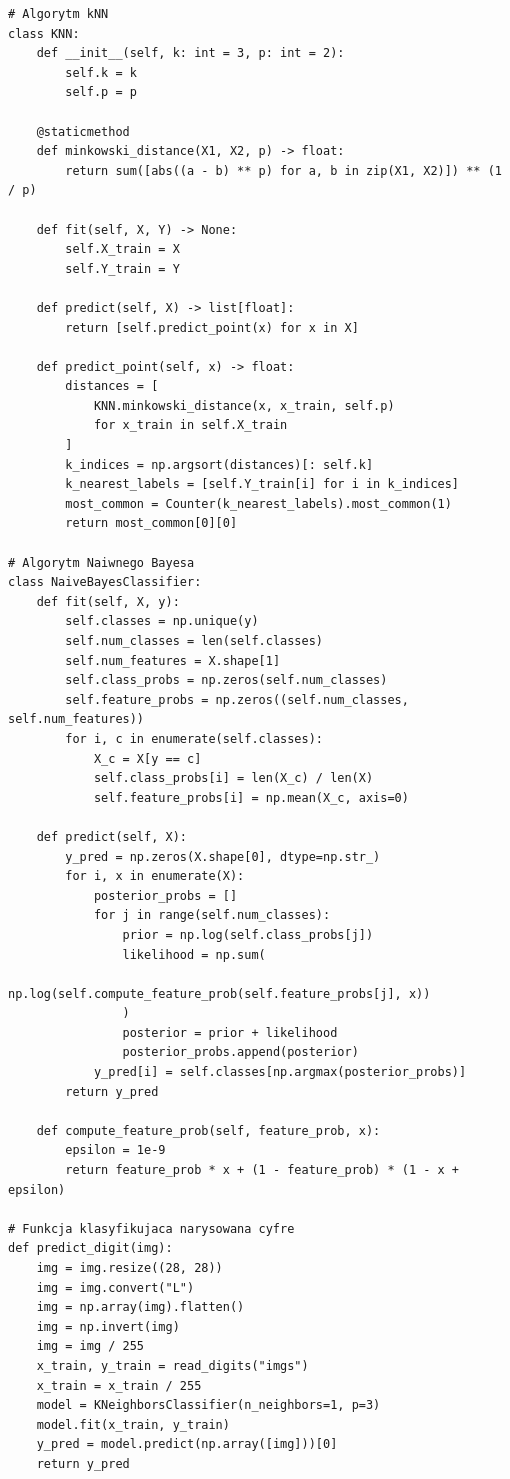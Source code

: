 \documentclass[12pt,a4paper]{article}
\begin{document}
\begin{lstlisting}
# Algorytm kNN
class KNN:
    def __init__(self, k: int = 3, p: int = 2):
        self.k = k
        self.p = p

    @staticmethod
    def minkowski_distance(X1, X2, p) -> float:
        return sum([abs((a - b) ** p) for a, b in zip(X1, X2)]) ** (1 / p)

    def fit(self, X, Y) -> None:
        self.X_train = X
        self.Y_train = Y

    def predict(self, X) -> list[float]:
        return [self.predict_point(x) for x in X]

    def predict_point(self, x) -> float:
        distances = [
            KNN.minkowski_distance(x, x_train, self.p)
            for x_train in self.X_train
        ]
        k_indices = np.argsort(distances)[: self.k]
        k_nearest_labels = [self.Y_train[i] for i in k_indices]
        most_common = Counter(k_nearest_labels).most_common(1)
        return most_common[0][0]

# Algorytm Naiwnego Bayesa
class NaiveBayesClassifier:
    def fit(self, X, y):
        self.classes = np.unique(y)
        self.num_classes = len(self.classes)
        self.num_features = X.shape[1]
        self.class_probs = np.zeros(self.num_classes)
        self.feature_probs = np.zeros((self.num_classes, self.num_features))
        for i, c in enumerate(self.classes):
            X_c = X[y == c]
            self.class_probs[i] = len(X_c) / len(X)
            self.feature_probs[i] = np.mean(X_c, axis=0)

    def predict(self, X):
        y_pred = np.zeros(X.shape[0], dtype=np.str_)
        for i, x in enumerate(X):
            posterior_probs = []
            for j in range(self.num_classes):
                prior = np.log(self.class_probs[j])
                likelihood = np.sum(
                    np.log(self.compute_feature_prob(self.feature_probs[j], x))
                )
                posterior = prior + likelihood
                posterior_probs.append(posterior)
            y_pred[i] = self.classes[np.argmax(posterior_probs)]
        return y_pred

    def compute_feature_prob(self, feature_prob, x):
        epsilon = 1e-9
        return feature_prob * x + (1 - feature_prob) * (1 - x + epsilon)

# Funkcja klasyfikujaca narysowana cyfre
def predict_digit(img):
    img = img.resize((28, 28))
    img = img.convert("L")
    img = np.array(img).flatten()
    img = np.invert(img)
    img = img / 255
    x_train, y_train = read_digits("imgs")
    x_train = x_train / 255
    model = KNeighborsClassifier(n_neighbors=1, p=3)
    model.fit(x_train, y_train)
    y_pred = model.predict(np.array([img]))[0]
    return y_pred
\end{lstlisting}
\end{document}
